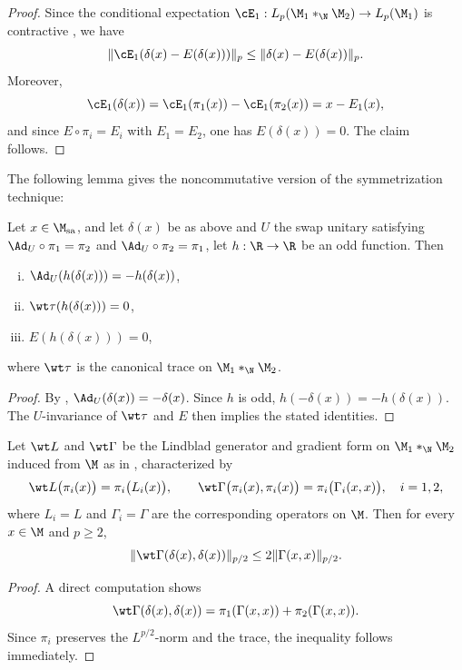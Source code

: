 \documentclass[sn-mathphys-num]{sn-jnl}
\begin{document}
\begin{proof}
Since the conditional expectation $\cE_1:L_p(\M_1*_\N\M_2)\to L_p(\M_1)
$ is contractive \cite{takesaki_theory_2003-2}, we have
\[
\|\cE_1(\delta(x)-E(\delta(x)))\|_p\le \|\delta(x)-E(\delta(x))\|_p .
\]
Moreover,
\[
\cE_1(\delta(x))
=\cE_1(\pi_1(x))-\cE_1(\pi_2(x))
=x-E_1(x),
\]
and since $E\circ\pi_i=E_i$ with $E_1=E_2$, one has $E(\delta(x))=0$.
The claim follows.
\end{proof}
The following lemma gives the noncommutative version of the symmetrization technique:
\begin{lemma}\label{lem:odd}
Let $x\in\M_{\mathrm{sa}}$, and let $\delta(x)$ be as above and $U$ the swap unitary satisfying
$\Ad_U\circ\pi_1=\pi_2$ and $\Ad_U\circ\pi_2=\pi_1$,
let $h:\R\to\R$ be an odd function. Then
\begin{enumerate}[(i)]
  \item $\Ad_U(h(\delta(x)))=-h(\delta(x))$,
  \item $\wt\tau(h(\delta(x)))=0$,
  \item $E(h(\delta(x)))=0$,
\end{enumerate}
where $\wt\tau$ is the canonical trace on $\M_1*_\N\M_2$.
\end{lemma}

\begin{proof}
By , $\Ad_U(\delta(x))=-\delta(x)$.
Since $h$ is odd, $h(-\delta(x))=-h(\delta(x))$.
The $U$-invariance of $\wt\tau$ and $E$ then implies the stated identities.
\end{proof}

\begin{lemma}\label{lem:factor-2}
Let $\wt L$ and $\wt \Gamma$ be the Lindblad generator and gradient form on
$\M_1*_\N\M_2$ induced from $\M$ as in \cite{boca_completely_1993}, characterized by
\[\wt L\bigl(\pi_i(x)\bigr)
= \pi_i\bigl(L_i(x)\bigr),
\qquad
\wt\Gamma\bigl(\pi_i(x),\pi_i(x)\bigr)
= \pi_i\bigl(\Gamma_i(x,x)\bigr),
\quad i=1,2,\]
where $L_i=L$ and $\Gamma_i=\Gamma$ are the corresponding operators on $\M$.
Then for every $x\in\M$ and $p\ge2$,
\[
  \|\wt\Gamma(\delta(x),\delta(x))\|_{p/2}
  \le 2\|\Gamma(x,x)\|_{p/2}.
\]
\end{lemma}

\begin{proof}
A direct computation shows
\[
\wt \Gamma(\delta(x),\delta(x))
=\pi_1(\Gamma(x,x))+\pi_2(\Gamma(x,x)).
\]
Since $\pi_i$ preserves the $L^{p/2}$-norm and the trace,
the inequality follows immediately.
\end{proof}
\end{document}
